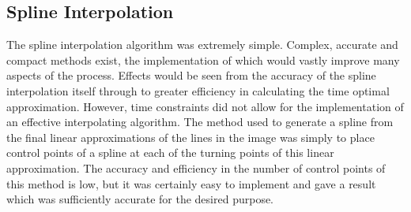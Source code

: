 \subsection{Spline Interpolation}
The spline interpolation algorithm was extremely simple. Complex, accurate and compact methods exist, the implementation of which would vastly improve many aspects of the process. Effects would be seen from the accuracy of the spline interpolation itself through to greater efficiency in calculating the time optimal approximation. However, time constraints did not allow for the implementation of an effective interpolating algorithm. The method used to generate a spline from the final linear approximations of the lines in the image was simply to place control points of a spline at each of the turning points of this linear approximation. The accuracy and efficiency in the number of control points of this method is low, but it was certainly easy to implement and gave a result which was sufficiently accurate for the desired purpose.
\clearpage